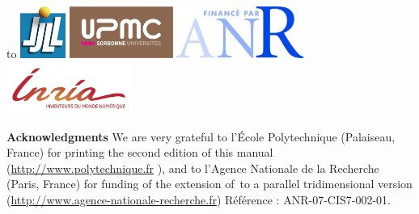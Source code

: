 \documentclass[a4paper,twoside,12pt]{book}
\begin{document}
\vfill
\hbox to \hsize
{\hss
\includegraphics[height=1.7cm]{LogoLJLL} \hss
\includegraphics[height=1.7cm]{LogoUPMC} \hss
\includegraphics[height=1.7cm]{logo-finance-par-anr} \hss
\includegraphics[height=1.7cm]{INRIA-logo} \hss
}
\bigskip

{\small {\bf Acknowledgments}
We are very grateful  to  l'\'Ecole Polytechnique  (Palaiseau, France)  for  printing the second edition of this manual (\url{http://www.polytechnique.fr} ),
and to l'Agence Nationale de la Recherche (Paris, France)
 for funding of the extension  of\ \freefempp to a parallel tridimensional version (\url{http://www.agence-nationale-recherche.fr}) R\'{e}f\'{e}rence : ANR-07-CIS7-002-01.}

\cleardoublepage

\tableofcontents
\let\subsubsection\subsection
\let\subsection\section
\let\section\chapter
\end{document}
